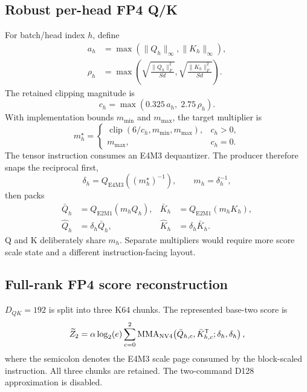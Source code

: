 \subsection{Robust per-head FP4 Q/K}

For batch/head index $h$, define
\begin{align}
  a_h &=
    \max\!\left(\lVert Q_h\rVert_\infty,\lVert K_h\rVert_\infty\right),\\
  \rho_h &=
    \max\!\left(
      \sqrt{\frac{\lVert Q_h\rVert_F^2}{S d}},
      \sqrt{\frac{\lVert K_h\rVert_F^2}{S d}}
    \right).
  \label{eq:head-stats}
\end{align}
The retained clipping magnitude is
\begin{equation}
  c_h=\max(0.325\,a_h,\;2.75\,\rho_h).
  \label{eq:robust-clip}
\end{equation}
With implementation bounds $m_{\min}$ and $m_{\max}$, the target multiplier
is
\begin{equation}
  m_h^\star=
  \begin{cases}
    \operatorname{clip}\!\left(6/c_h,m_{\min},m_{\max}\right),
      &c_h>0,\\
    m_{\max},&c_h=0.
  \end{cases}
  \label{eq:target-multiplier}
\end{equation}
The tensor instruction consumes an E4M3 dequantizer.  The producer therefore
snaps the reciprocal first,
\begin{equation}
  \delta_h=Q_{\mathrm{E4M3}}\!\left((m_h^\star)^{-1}\right),
  \qquad m_h=\delta_h^{-1},
  \label{eq:snap-dequantizer}
\end{equation}
then packs
\begin{align}
  \bar Q_h &= Q_{\mathrm{E2M1}}(m_hQ_h),&
  \bar K_h &= Q_{\mathrm{E2M1}}(m_hK_h),\\
  \widehat Q_h &= \delta_h\bar Q_h,&
  \widehat K_h &= \delta_h\bar K_h.
  \label{eq:adaptive-qk}
\end{align}
Q and K deliberately share $m_h$.  Separate multipliers would require more
score scale state and a different instruction-facing layout.

\subsection{Full-rank FP4 score reconstruction}

$D_{QK}=192$ is split into three K64 chunks.  The represented base-two score
is
\begin{equation}
  \widetilde Z_2 =
  \alpha\log_2(e)
  \sum_{c=0}^{2}
  \operatorname{MMA}_{\mathrm{NV4}}\!\left(
    \bar Q_{h,c},\bar K_{h,c}^{\mathsf T};
    \delta_h,\delta_h
  \right),
  \label{eq:represented-score}
\end{equation}
where the semicolon denotes the E4M3 scale page consumed by the block-scaled
instruction.  All three chunks are retained.  The two-command D128
approximation is disabled.

